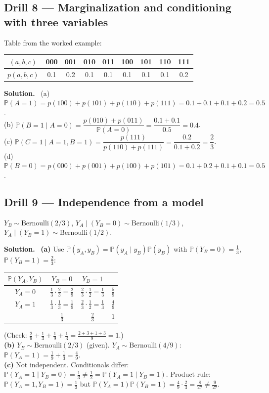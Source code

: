 \documentclass[11pt]{article}
\renewcommand{\P}{\mathbb{P}}
\newcommand{\Bern}{\text{Bernoulli}}
\newenvironment{soln}{\par\smallskip\noindent\textbf{Solution.}\ }{\par\medskip}
\begin{document}
\subsection*{Drill 8 --- Marginalization and conditioning with three variables}
Table from the worked example:
\begin{center}
\begin{tabular}{@{}c|cccccccc@{}}
$(a,b,c)$ & 000 & 001 & 010 & 011 & 100 & 101 & 110 & 111\\\hline
$p(a,b,c)$ & 0.1 & 0.2 & 0.1 & 0.1 & 0.1 & 0.1 & 0.1 & 0.2
\end{tabular}
\end{center}
\begin{soln}
(a) $\P(A{=}1)=p(100)+p(101)+p(110)+p(111)=0.1+0.1+0.1+0.2=0.5$.\\
(b) $\P(B{=}1\mid A{=}0)=\dfrac{p(010)+p(011)}{\P(A{=}0)}=\dfrac{0.1+0.1}{0.5}=0.4$.\\
(c) $\P(C{=}1\mid A{=}1,B{=}1)=\dfrac{p(111)}{p(110)+p(111)}=\dfrac{0.2}{0.1+0.2}=\dfrac23$.\\
(d) $\P(B{=}0)=p(000)+p(001)+p(100)+p(101)=0.1+0.2+0.1+0.1=0.5$.
\end{soln}

\subsection*{Drill 9 --- Independence from a model}
$Y_B\sim\Bern(2/3)$, $Y_A\mid(Y_B{=}0)\sim\Bern(1/3)$, $Y_A\mid(Y_B{=}1)\sim\Bern(1/2)$.
\begin{soln}
\textbf{(a)} Use $\P(y_A,y_B)=\P(y_A\mid y_B)\P(y_B)$ with $\P(Y_B{=}0)=\frac13$, $\P(Y_B{=}1)=\frac23$:
\begin{center}
\begin{tabular}{c|cc|c}
$\P(Y_A,Y_B)$ & $Y_B=0$ & $Y_B=1$ &\\\hline
$Y_A=0$ & $\frac13\cdot\frac23=\frac29$ & $\frac23\cdot\frac12=\frac13$ & $\frac59$\\
$Y_A=1$ & $\frac13\cdot\frac13=\frac19$ & $\frac23\cdot\frac12=\frac13$ & $\frac49$\\\hline
 & $\frac13$ & $\frac23$ & $1$
\end{tabular}
\end{center}
(Check: $\frac29+\frac13+\frac19+\frac13=\frac{2+3+1+3}9=1$.)\\
\textbf{(b)} $Y_B\sim\Bern(2/3)$ (given). $Y_A\sim\Bern(4/9)$: $\P(Y_A{=}1)=\frac19+\frac13=\frac49$.\\
\textbf{(c)} Not independent. Conditionals differ: $\P(Y_A{=}1\mid Y_B{=}0)=\frac13\ne\frac12=\P(Y_A{=}1\mid Y_B{=}1)$. Product rule: $\P(Y_A{=}1,Y_B{=}1)=\frac13$ but $\P(Y_A{=}1)\P(Y_B{=}1)=\frac49\cdot\frac23=\frac8{27}\ne\frac9{27}$.
\end{soln}
\end{document}
